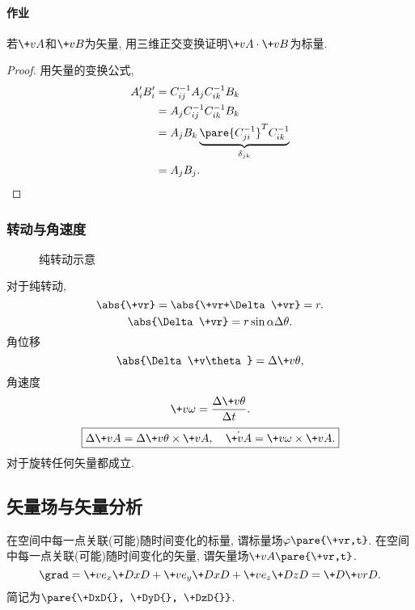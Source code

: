 \documentclass{ctexart}
\begin{document}

\paragraph{作业} %
\label{par:作业}

若$\+vA$和$\+vB$为矢量, 用三维正交变换证明$\+vA\cdot\+vB$为标量.


\begin{proof}
    用矢量的变换公式,
    \begin{align*}
        A'_i B'_i &= C_{ij}^{-1} A_j C_{ik}^{-1} B_k \\
        &= A_j C_{ij}^{-1} C_{ik}^{-1} B_k \\
        &= A_jB_k \underbrace{\pare{C^{-1}_{ji}}^T C^{-1}_{ik}}_{\delta_{jk}} \\
        &= A_jB_j.
    \end{align*}
\end{proof}


\subsubsection{转动与角速度} %
\label{ssub:转动与角速度}

\begin{figure}[ht]
    \centering
    \caption{纯转动示意}
\end{figure}
对于纯转动,
\[ \abs{\+vr} = \abs{\+vr+\Delta\+vr} = r. \]
\[ \abs{\Delta \+vr} = r\sin\alpha\Delta\theta. \]
角位移
\[ \abs{\Delta\+v\theta} = \Delta\+v\theta, \]
角速度
\[ \+v\omega = \frac{\Delta\+v\theta}{\Delta t}. \]
\[ \boxed{\Delta\+vA = \Delta\+v\theta\times\+vA,\quad \dot{\+vA} = \+v\omega\times\+vA.} \]
对于旋转任何矢量都成立.



\subsection{矢量场与矢量分析} %
\label{sub:矢量场与矢量分析}

在空间中每一点关联(可能)随时间变化的标量, 谓标量场$\varphi\pare{\+vr,t}$. 在空间中每一点关联(可能)随时间变化的矢量, 谓矢量场$\+vA\pare{\+vr,t}$.
\[ \grad = \+ve_x \+DxD{} + \+ve_y\+DxD{} + \+ve_z\+DzD{} = \+D{\+vr}D{}. \]
简记为$\displaystyle \pare{\+DxD{}, \+DyD{}, \+DzD{}}$.
\end{document}
